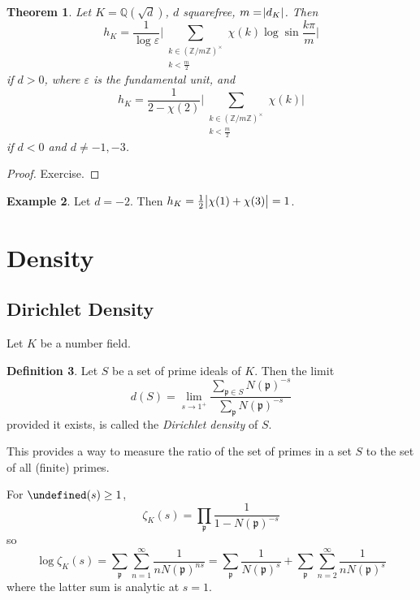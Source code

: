\documentclass[11pt]{article}
\theoremstyle{definition}
\newtheorem{definition}{Definition}[section]
\newtheorem{example}[definition]{Example}
\theoremstyle{plain}
\newtheorem{theorem}[definition]{Theorem}
\theoremstyle{remark}
\let\Re\undefined
\DeclareMathOperator{\Re}{Re}
\newcommand{\ZZ}{\mathbb{Z}}
\newcommand{\QQ}{\mathbb{Q}}
\newcommand{\fp}{\mathfrak{p}}
\begin{document}
\begin{theorem}\label{thm:7_27}
    Let $K = \QQ(\sqrt{d})$, $d$ squarefree, $m = \abs{d_K}$. Then
    \begin{equation*}
        h_K = \frac{1}{\log \varepsilon} \Bigg\lvert \sum_{\substack{k \in (\ZZ / m\ZZ)^\times \\ k < \frac{m}{2}}} \chi(k) \log \sin \frac{k \pi}{m} \Bigg\rvert
    \end{equation*}
    if $d > 0$, where $\varepsilon$ is the fundamental unit, and
    \begin{equation*}
        h_K = \frac{1}{2 - \chi(2)} \Bigg\lvert \sum_{\substack{k \in (\ZZ/m\ZZ)^\times \\ k < \frac{m}{2}}} \chi(k) \Bigg\rvert
    \end{equation*}
    if $d < 0$ and $d \neq -1, -3$.
\end{theorem}
\begin{proof}
    Exercise.
\end{proof}

\begin{example}\label{eg:7_28}
    Let $d = -2$. Then $h_K = \frac{1}{2} \abs{\chi(1) + \chi(3)} = 1$.
\end{example}

\section{Density}

\subsection{Dirichlet Density}

Let $K$ be a number field.

\begin{definition}\label{def:8_1}
    Let $S$ be a set of prime ideals of $K$. Then the limit
    \begin{equation*}
        d(S) = \lim_{s \to 1^+} \frac{\sum_{\fp \in S} N(\fp)^{-s}}{\sum_{\fp} N(\fp)^{-s}}
    \end{equation*}
    provided it exists, is called the \emph{Dirichlet density} of $S$.
\end{definition}

This provides a way to measure the ratio of the set of primes in a set $S$ to the set of all (finite) primes.

For $\Re(s) \ge 1$,
\begin{equation*}
    \zeta_K(s) = \prod_{\fp} \frac{1}{1 - N(\fp)^{-s}}
\end{equation*}
so
\begin{equation*}
    \log \zeta_K(s) = \sum_{\fp} \sum_{n=1}^\infty \frac{1}{n N(\fp)^{ns}} = \sum_{\fp} \frac{1}{N(\fp)^s} + \sum_{\fp} \sum_{n=2}^\infty \frac{1}{n N(\fp)^s}
\end{equation*}
where the latter sum is analytic at $s=1$.
\end{document}
